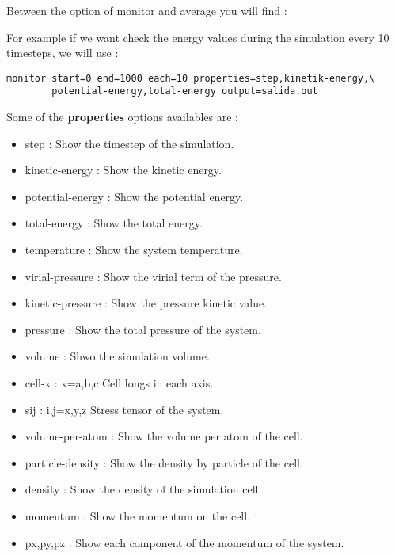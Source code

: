 Between the option of monitor and average you will find :


For example if we want check the energy values during the simulation every 10
timesteps, we will use :

\begin{verbatim}
monitor start=0 end=1000 each=10 properties=step,kinetik-energy,\
        potential-energy,total-energy output=salida.out
\end{verbatim}

Some of the \textbf{properties} options availables are :

\begin{itemize}
 \item step : Show the timestep of the simulation.
 \item kinetic-energy : Show the kinetic energy.
 \item potential-energy : Show the potential energy.
 \item total-energy : Show the total energy.
 \item temperature : Show the system temperature.
 \item virial-pressure : Show the virial term of the pressure.
 \item kinetic-pressure : Show the pressure kinetic value.
 \item pressure : Show the total pressure of the system.
 \item volume : Shwo the simulation volume.
 \item cell-x : x=a,b,c Cell longs in each axis.
 \item sij : i,j=x,y,z Stress tensor of the system.
 \item volume-per-atom : Show the volume per atom of the cell.
 \item particle-density : Show the density by particle of the cell.
 \item density : Show the density of the simulation cell.
 \item momentum : Show the momentum on the cell.
 \item px,py,pz : Show each component of the momentum of the system.
\end{itemize}

